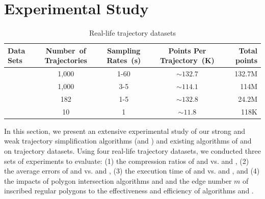\section{Experimental Study} %
\label{sec-exp}

\begin{table}[bt!]
	\caption{\small Real-life trajectory datasets}
	\vspace{-1ex}
	\centering
	\small
	\begin{tabular}{|l|c|c|c|r|}
		\hline
		\bf{ Data Sets}& \bf{Number\ of Trajectories}     &\bf {Sampling Rates\ (s)}   &\bf{Points Per Trajectory\ (K)}    &\bf {Total points} \\
		\hline
		\truck	&1,000	    &1-60	    &$\sim132.7$     &132.7M \\
		\hline
		\sercar	&1,000	    &3-5	    &$\sim114.1$   &114M\\
		\hline
		\geolife &182	    &1-5	    &$\sim132.8$   &24.2M\\
		\hline
		\pricar	& 10	    &1	        &$\sim11.8$      &118K \\
		\hline
	\end{tabular}
	\label{tab:datasets}
	\vspace{-2ex}
\end{table}


In this section, we present an extensive experimental study of our strong and weak trajectory simplification algorithms (\cist and \cista) and existing algorithms of \dps and \squishe on trajectory datasets.
Using four real-life trajectory datasets, we conducted three sets of experiments to evaluate:
(1) the compression ratios of \cist and \cista vs. \dps and \squishe,
(2) the average errors of \cist and \cista vs. \dps and \squishe,
(3) the execution time of \cist and \cista vs. \dps and \squishe, and
(4) the impacts of polygon intersection algorithms \rpia and \cpia and the edge number $m$ of inscribed regular polygons to the effectiveness and efficiency of algorithms \cist and \cista.


